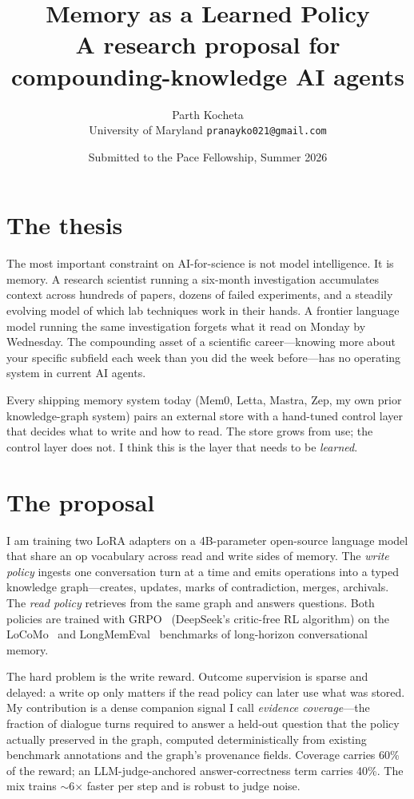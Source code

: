\documentclass[11pt]{article}
\title{\bfseries Memory as a Learned Policy\\
\large A research proposal for compounding-knowledge AI agents}
\author{Parth Kocheta \\\small University of Maryland \;\textbar\; \texttt{pranayko021@gmail.com}}
\date{Submitted to the Pace Fellowship, Summer 2026}
\begin{document}
\maketitle
\vspace{-1em}

\section*{The thesis}

The most important constraint on AI-for-science is not model intelligence.
It is memory. A research scientist running a six-month investigation
accumulates context across hundreds of papers, dozens of failed
experiments, and a steadily evolving model of which lab techniques work
in their hands. A frontier language model running the same investigation
forgets what it read on Monday by Wednesday. The compounding asset of a
scientific career---knowing more about your specific subfield each week
than you did the week before---has no operating system in current AI
agents.

Every shipping memory system today (Mem0, Letta, Mastra, Zep, my own
prior knowledge-graph system) pairs an external store with a hand-tuned
control layer that decides what to write and how to read. The store grows
from use; the control layer does not. I think this is the layer that
needs to be \emph{learned}.

\section*{The proposal}

I am training two LoRA adapters on a 4B-parameter open-source language
model that share an op vocabulary across read and write sides of memory.
The \emph{write policy} ingests one conversation turn at a time and emits
operations into a typed knowledge graph---creates, updates, marks of
contradiction, merges, archivals. The \emph{read policy} retrieves from
the same graph and answers questions. Both policies are trained with
GRPO~\cite{shao2024deepseekmath} (DeepSeek's critic-free RL algorithm)
on the LoCoMo~\cite{maharana2024locomo} and
LongMemEval~\cite{wu2024longmemeval} benchmarks of long-horizon
conversational memory.

The hard problem is the write reward. Outcome supervision is sparse and
delayed: a write op only matters if the read policy can later use what
was stored. My contribution is a dense companion signal I call
\emph{evidence coverage}---the fraction of dialogue turns required to
answer a held-out question that the policy actually preserved in the
graph, computed deterministically from existing benchmark annotations
and the graph's provenance fields. Coverage carries 60\% of the reward;
an LLM-judge-anchored answer-correctness term carries 40\%. The mix
trains $\sim$6$\times$ faster per step and is robust to judge noise.
\end{document}
